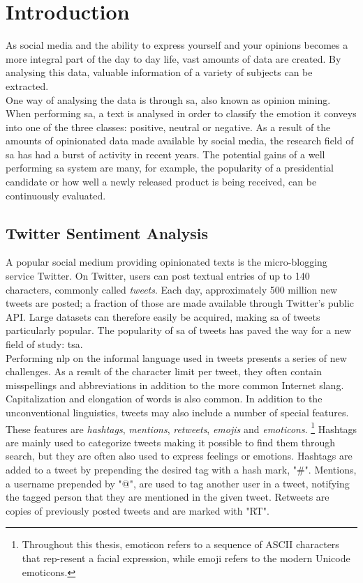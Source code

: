 \chapter{Introduction}
\label{cha:introduction}
As social media and the ability to express yourself and your opinions becomes a more integral part of the day to day life, vast amounts of data are created. By analysing this data, valuable information of a variety of subjects can be extracted. \\

One way of analysing the data is through \ac{sa}, also known as opinion mining. When performing \ac{sa}, a text is analysed in order to classify the emotion it conveys into one of the three classes: positive, neutral or negative. As a result of the amounts of opinionated data made available by social media, the research field of \ac{sa} has had a burst of activity in recent years. The potential gains of a well performing \ac{sa} system are many, for example, the popularity of a presidential candidate or how well a newly released product is being received, can be continuously evaluated.


\section{Twitter Sentiment Analysis}
\label{sec:field}
A popular social medium providing opinionated texts is the micro-blogging service Twitter. On Twitter, users can post textual entries of up to 140 characters, commonly called \textit{tweets}. Each day, approximately 500 million new tweets are posted; a fraction of those are made available through Twitter's public API. Large datasets can therefore easily be acquired, making \ac{sa} of tweets particularly popular. The popularity of \ac{sa} of tweets has paved the way for a new field of study: \ac{tsa}.\\

Performing \ac{nlp} on the informal language used in tweets presents a series of new challenges. As a result of the character limit per tweet, they often contain misspellings and abbreviations in addition to the more common Internet slang. Capitalization and elongation of words is also common. In addition to the unconventional linguistics, tweets may also include a number of special features. These features are \textit{hashtags}, \textit{mentions}, \textit{retweets}, \textit{emojis} and \textit{emoticons}. \footnote{Throughout this thesis, emoticon refers to a sequence of ASCII characters that rep-resent a facial expression, while emoji refers to the modern Unicode emoticons.} Hashtags are mainly used to categorize tweets making it possible to find them through search, but they are often also used to express feelings or emotions. Hashtags are added to a tweet by prepending the desired tag with a hash mark, "\#". Mentions, a username prepended by "@", are used to tag another user in a tweet, notifying the tagged person that they are mentioned in the given tweet. Retweets are copies of previously posted tweets and are marked with "RT". 

